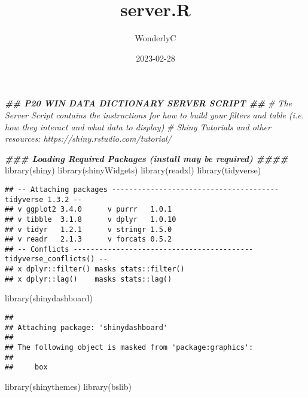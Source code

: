 \documentclass[
]{article}
\title{server.R}
\author{WonderlyC}
\date{2023-02-28}
\newenvironment{Shaded}{\begin{snugshade}}{\end{snugshade}}
\newcommand{\CommentTok}[1]{\textcolor[rgb]{0.56,0.35,0.01}{\textit{#1}}}
\newcommand{\DocumentationTok}[1]{\textcolor[rgb]{0.56,0.35,0.01}{\textbf{\textit{#1}}}}
\newcommand{\FunctionTok}[1]{\textcolor[rgb]{0.00,0.00,0.00}{#1}}
\newcommand{\NormalTok}[1]{#1}
\begin{document}
\maketitle

\begin{Shaded}
\begin{Highlighting}[]
\DocumentationTok{\#\# P20 WIN DATA DICTIONARY SERVER SCRIPT \#\#}
\CommentTok{\# The Server Script contains the instructions for how to build your filters and table (i.e. how they interact and what data to display)}
\CommentTok{\# Shiny Tutorials and other resources: https://shiny.rstudio.com/tutorial/}

\DocumentationTok{\#\#\# Loading Required Packages (install may be required) \#\#\#\#}
\FunctionTok{library}\NormalTok{(shiny)}
\FunctionTok{library}\NormalTok{(shinyWidgets)}
\FunctionTok{library}\NormalTok{(readxl)}
\FunctionTok{library}\NormalTok{(tidyverse)}
\end{Highlighting}
\end{Shaded}

\begin{verbatim}
## -- Attaching packages --------------------------------------- tidyverse 1.3.2 --
## v ggplot2 3.4.0      v purrr   1.0.1 
## v tibble  3.1.8      v dplyr   1.0.10
## v tidyr   1.2.1      v stringr 1.5.0 
## v readr   2.1.3      v forcats 0.5.2 
## -- Conflicts ------------------------------------------ tidyverse_conflicts() --
## x dplyr::filter() masks stats::filter()
## x dplyr::lag()    masks stats::lag()
\end{verbatim}

\begin{Shaded}
\begin{Highlighting}[]
\FunctionTok{library}\NormalTok{(shinydashboard)}
\end{Highlighting}
\end{Shaded}

\begin{verbatim}
## 
## Attaching package: 'shinydashboard'
## 
## The following object is masked from 'package:graphics':
## 
##     box
\end{verbatim}

\begin{Shaded}
\begin{Highlighting}[]
\FunctionTok{library}\NormalTok{(shinythemes)}
\FunctionTok{library}\NormalTok{(bslib)}
\end{Highlighting}
\end{Shaded}
\end{document}
